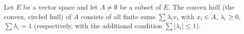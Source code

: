 Let $E$ be a vector space and let $A \neq \emptyset$ be a subset of $E$. The convex hull (the convex, circled hull) of $A$ consists of all finite sums $\sum \lambda_i x_i$ with $x_i \in A$, $\lambda_i \geq 0$, $\sum \lambda_i = 1$ (respectively, with the additional condition $\sum |\lambda_i| \leq 1$).
